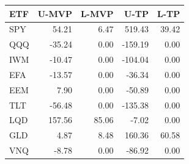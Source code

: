 \begin{tabular}{lrrrr}
\toprule
ETF & U-MVP & L-MVP & U-TP & L-TP \\
\midrule
SPY & 54.21 & 6.47 & 519.43 & 39.42 \\
QQQ & -35.24 & 0.00 & -159.19 & 0.00 \\
IWM & -10.47 & 0.00 & -104.04 & 0.00 \\
EFA & -13.57 & 0.00 & -36.34 & 0.00 \\
EEM & 7.90 & 0.00 & -50.89 & 0.00 \\
TLT & -56.48 & 0.00 & -135.38 & 0.00 \\
LQD & 157.56 & 85.06 & -7.02 & 0.00 \\
GLD & 4.87 & 8.48 & 160.36 & 60.58 \\
VNQ & -8.78 & 0.00 & -86.92 & 0.00 \\
\bottomrule
\end{tabular}
